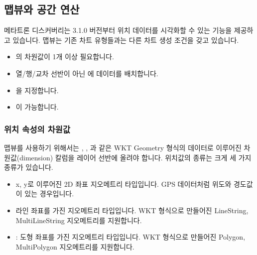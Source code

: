 \documentclass[letterpaper,10pt,english]{sphinxmanual}
\begin{document}
\subsection{맵뷰와 공간 연산}
\label{\detokenize{discovery/part04/map_chart:id1}}\label{\detokenize{discovery/part04/map_chart::doc}}
메타트론 디스커버리는 3.1.0 버전부터 위치 데이터를 시각화할 수 있는  기능을 제공하고 있습니다. 맵뷰는 기존 차트 유형들과는 다른 차트 생성 조건을 갖고 있습니다.
\begin{quote}

\begin{figure}[H]
\centering

\noindent{}
\end{figure}
\end{quote}
\begin{itemize}
\item {} 
 의 차원값이 1개 이상 필요합니다.

\item {} 
열/행/교차 선반이 아닌  에 데이터를 배치합니다.

\item {} 
 을 지정합니다.

\item {} 
 이 가능합니다.

\end{itemize}


\subsubsection{위치 속성의 차원값}
\label{\detokenize{discovery/part04/map_chart:id2}}
맵뷰를 사용하기 위해서는 , ,  과 같은 WKT Geometry 형식의 데이터로 이루어진 차원값(dimension) 칼럼을 레이어 선반에 올려야 합니다. 위치값의 종류는 크게 세 가지 종류가 있습니다.
\begin{itemize}
\item {} 
 x, y로 이루어진 2D 좌표 지오메트리 타입입니다. GPS 데이터처럼 위도와 경도값이 있는 경우입니다.

\item {} 
 라인 좌표를 가진 지오메트리 타입입니다. WKT 형식으로 만들어진 LineString, MultiLineString 지오메트리를 지원합니다.

\item {} 
 : 도형 좌표를 가진 지오메트리 타입입니다. WKT 형식으로 만들어진 Polygon, MultiPolygon 지오메트리를 지원합니다.
\begin{quote}

\begin{figure}[H]
\centering

\noindent{}
\end{figure}
\end{quote}

\end{itemize}
\end{document}
